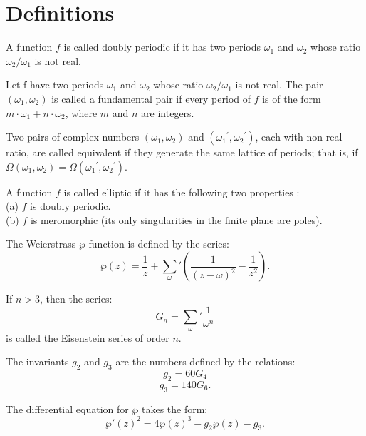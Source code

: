 \section{Definitions}

\begin{definition}
    A function $f$ is called doubly periodic if it has two periods $\omega_1$ and $\omega_2$ whose ratio
    $\omega_2 / \omega_1$ is not real.
\end{definition}

\begin{definition}
    Let f have two periods $\omega_1$ and $\omega_2$ whose ratio $\omega_2 / \omega_1$ is not real.
    The pair $(\omega_1, \omega_2)$ is called a fundamental pair if every
    period of $f$ is of the form $m \cdot \omega_1 + n \cdot \omega_2$, where $m$ and $n$ are integers.
\end{definition}

\begin{definition}
    Two pairs of complex numbers $(\omega_1, \omega_2)$ and $({\omega_1}^\prime, {\omega_2}^\prime)$, each with
    non-real ratio, are called equivalent if they generate the same lattice of periods; that is,
    if $\Omega(\omega_1, \omega_2) = \Omega({\omega_1}^\prime, {\omega_2}^\prime)$.
\end{definition}

\begin{definition}
    A function $f$ is called elliptic if it has the following two properties :\\
    (a) $f$ is doubly periodic.\\
    (b) $f$ is meromorphic (its only singularities in the finite plane are poles).
\end{definition}

\begin{definition}
    The Weierstrass $\wp$ function is defined by the series:
    \[
        \wp(z)= \frac{1}{z} + \sum_{\omega}{'} ( \frac{1}{(z - \omega)^2} - \frac{1}{z^2} ).
    \]
\end{definition}

\begin{definition}
    If $n > 3$, then the series:
    \[
        G_n = \sum_{\omega}{'} \frac{1}{\omega^n}
    \]
    is called the Eisenstein series of order $n$.
\end{definition}

\begin{definition}[invariants $g_2, g_3$]
    The invariants $g_2$ and $g_3$ are the numbers defined by the relations:
    \[
        g_2 = 60 G_4
    \]
    \[
        g_3 = 140 G_6.
    \]
\end{definition}

\begin{definition}
    The differential equation for $\wp$ takes the form:
    \[
        \wp'(z)^2 = 4 \wp(z)^3 - g_2 \wp(z) - g_3.
    \]
\end{definition}